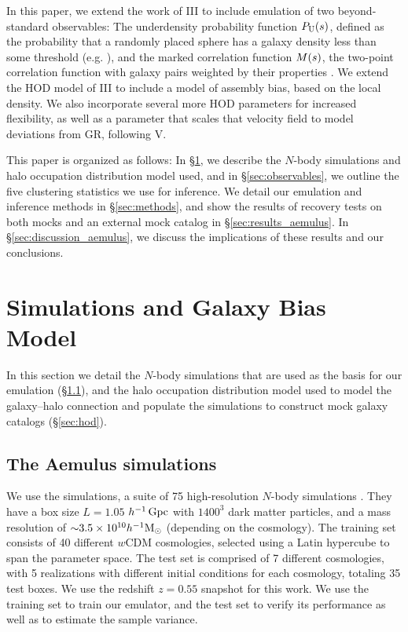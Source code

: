 In this paper, we extend the work of \aemulus III \citep{Zhai2019} to include emulation of two beyond-standard observables:
The underdensity probability function $P_\mathrm{U}(s)$, defined as the probability that a randomly placed sphere has a galaxy density less than some threshold (e.g. \citealt{HoyleVogeley2004}), and the marked correlation function $M(s)$, the two-point correlation function with galaxy pairs weighted by their properties \citep{Sheth2004}.
We extend the HOD model of \aemulus III to include a model of assembly bias, based on the local density.
We also incorporate several more HOD parameters for increased flexibility, as well as a parameter that scales that velocity field to model deviations from GR, following \aemulus V.

This paper is organized as follows:
In \S\ref{sec:sims_gals}, we describe the $N$-body simulations and halo occupation distribution model used, and in \S\ref{sec:observables}, we outline the five clustering statistics we use for inference.
We detail our emulation and inference methods in \S\ref{sec:methods}, and show the results of recovery tests on both \aemulus mocks and an external mock catalog in \S\ref{sec:results_aemulus}.
In \S\ref{sec:discussion_aemulus}, we discuss the implications of these results and our conclusions.


\section{Simulations and Galaxy Bias Model}
\label{sec:sims_gals}

In this section we detail the \aemulus $N$-body simulations that are used as the basis for our emulation (\S\ref{sec:aemulus}), and the halo occupation distribution model used to model the galaxy--halo connection and populate the simulations to construct mock galaxy catalogs (\S\ref{sec:hod}). 

\subsection{The Aemulus simulations}
\label{sec:aemulus}

We use the \aemulus simulations, a suite of 75 high-resolution $N$-body simulations \citep{DeRose2018}.
They have a box size $L = 1.05$ $h^{-1}\,\mathrm{Gpc}$ with $1400^3$ dark matter particles, and a mass resolution of $\mathord{\sim}3.5\times10^{10}h^{-1}\text{M}_{\odot}$ (depending on the cosmology).
The training set consists of 40 different $w$CDM cosmologies, selected using a Latin hypercube to span the parameter space.
The test set is comprised of 7 different cosmologies, with 5 realizations with different initial conditions for each cosmology, totaling 35 test boxes.
We use the redshift $z=0.55$ snapshot for this work.
We use the training set to train our emulator, and the test set to verify its performance as well as to estimate the sample variance.

